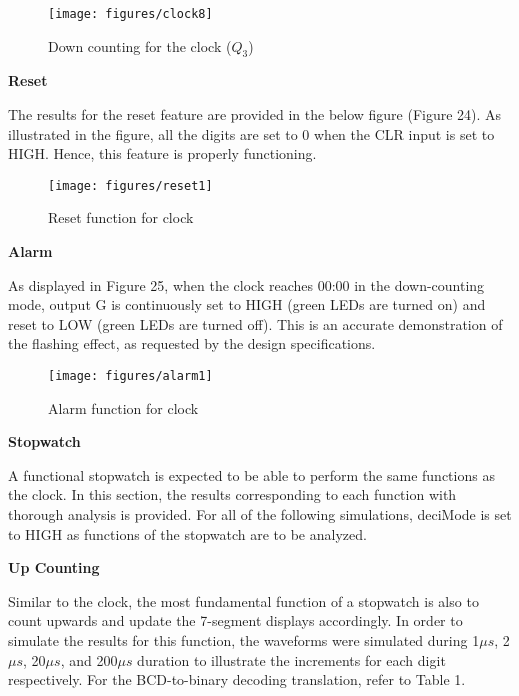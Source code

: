 \documentclass[12pt,a4paper]{article}
\begin{document}
	\begin{figure}[H]
		\centering
		\texttt{[image: figures/clock8]}
		\caption{Down counting for the clock ($Q_{3}$)}
	\end{figure}
		
	
	\noindent \textbf{Reset}
	\vspace{0.2cm}
	
	\noindent The results for the reset feature are provided in the below figure (Figure 24). As illustrated in the figure, all the digits are set to 0 when the CLR input is set to HIGH. Hence, this feature is properly functioning.
	
	
	\begin{figure}[H]
		\centering
		\texttt{[image: figures/reset1]}
		\caption{Reset function for clock}
	\end{figure}
		
	\noindent \textbf{Alarm}
	\vspace{0.2cm}
	
	\noindent As displayed in Figure 25, when the clock reaches 00:00 in the down-counting mode, output G is continuously set to HIGH (green LEDs are turned on) and reset to LOW (green LEDs are turned off). This is an accurate demonstration of the flashing effect, as requested by the design specifications.
		
	\begin{figure}[H]
		\centering
		\texttt{[image: figures/alarm1]}
		\caption{Alarm function for clock}
	\end{figure}
	
	\vspace{0.2cm}
	\noindent \textbf{\large Stopwatch}
	\vspace{0.2cm}
	
	\noindent A functional stopwatch is expected to be able to perform the same functions as the clock. In this section, the results corresponding to each function with thorough analysis is provided. For all of the following simulations, deciMode is set to HIGH as functions of the stopwatch are to be analyzed. 
	
	\vspace{0.2cm}
	\noindent \textbf{Up Counting}
	\vspace{0.2cm}
	
	\noindent Similar to the clock, the most fundamental function of a stopwatch is also to count upwards and update the 7-segment displays accordingly. In order to simulate the results for this function, the waveforms were simulated during 1$\mu s$, 2$\mu s$, 20$\mu s$, and 200$\mu s$ duration to illustrate the increments for each digit respectively. For the BCD-to-binary decoding translation, refer to Table 1. 
	
\end{document}
